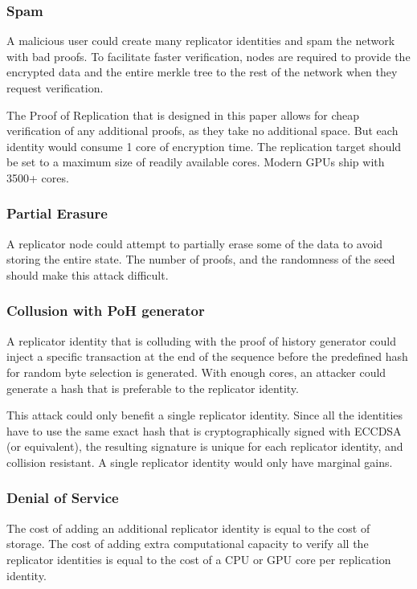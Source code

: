 \documentclass[12pt]{article}
\begin{document}
\subsubsection{Spam}
A malicious user could create many replicator identities and spam the network with bad proofs. To facilitate faster verification, nodes are required to provide the encrypted data and the entire merkle tree to the rest of the network when they request verification.

The Proof of Replication that is designed in this paper allows for cheap verification of any additional proofs, as they take no additional space. But each identity would consume 1 core of encryption time. The replication target should be set to a maximum size of readily available cores. Modern GPUs ship with 3500+ cores.

\subsubsection{Partial Erasure}

A replicator node could attempt to partially erase some of the data to avoid storing the entire state. The number of proofs, and the randomness of the seed should make this attack difficult.

\subsubsection{Collusion with PoH generator}

A replicator identity that is colluding with the proof of history generator could inject a specific transaction at the end of the sequence before the predefined hash for random byte selection is generated. With enough cores, an attacker could generate a hash that is preferable to the replicator identity.

This attack could only benefit a single replicator identity. Since all the identities have to use the same exact hash that is cryptographically signed with ECCDSA (or equivalent), the resulting signature is unique for each replicator identity, and collision resistant. A single replicator identity would only have marginal gains.
\subsubsection{Denial of Service}
The cost of adding an additional replicator identity is equal to the cost of storage. The cost of adding extra computational capacity to verify all the replicator identities is equal to the cost of a CPU or GPU core per replication identity.
\end{document}
